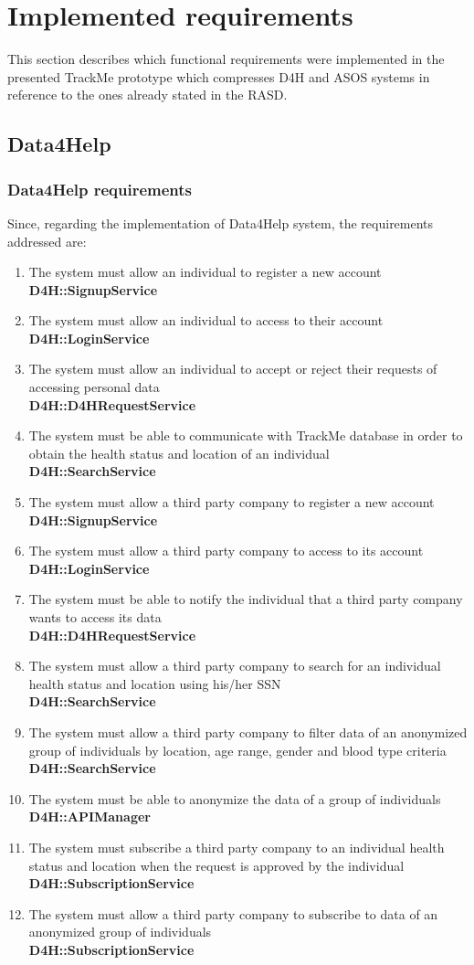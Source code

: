 \documentclass[a4paper, hidelinks, 12pt]{report}
\newcommand\requirement[1]{\item[{[R#1]}] }
\begin{document}
	\chapter{Implemented requirements}
This section describes which functional requirements were implemented in the presented TrackMe prototype which compresses D4H and ASOS systems in reference to the ones already stated in the RASD.

\section{\textbf{Data4Help}}
\subsection{Data4Help requirements}
	Since, regarding the implementation of Data4Help system, the requirements addressed are:

	\begin{enumerate}
		\requirement{1} The system must allow an individual to register a new account \\
		\textbf{D4H::SignupService}
		\requirement{2} The system must allow an individual to access to their account \\
		\textbf{D4H::LoginService}
		\requirement{3} The system must allow an individual to accept or reject their requests of accessing personal data \\
		\textbf{D4H::D4HRequestService}
		\requirement{4} The system must be able to communicate with TrackMe database in order to obtain the health status and location of an individual \\
		\textbf{D4H::SearchService}
		\requirement{5} The system must allow a third party company to register a new account \\
		\textbf{D4H::SignupService}
		\requirement{6} The system must allow a third party company to access to its account 	\\
		\textbf{D4H::LoginService}
		\requirement{7} The system must be able to notify the individual that a third party company wants to access its data \\
		\textbf{D4H::D4HRequestService}
		\requirement{8} The system must allow a third party company to search for an individual health status and location using his/her SSN \\
		 \textbf{D4H::SearchService}
		 \requirement{9} The system must allow a third party company to filter data of an anonymized group of individuals by location, age range, gender and blood type criteria \\
		 \textbf{D4H::SearchService}
		 \requirement{10} The system must be able to anonymize the data of a group of individuals \\
		 \textbf{D4H::APIManager}
		 \requirement{11} The system must subscribe a third party company to an individual health status and location when the request is approved by the individual \\
		\textbf{D4H::SubscriptionService}
		\requirement{12} The system must allow a third party company to subscribe to data of an anonymized group of individuals \\
		\textbf{D4H::SubscriptionService}
	\end{enumerate}
\end{document}
